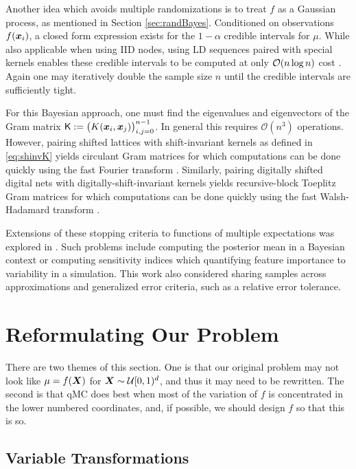 \documentclass{svproc}
\begin{document}
Another idea which avoids multiple randomizations is to treat $f$ as a Gaussian process, as mentioned in Section \ref{sec:randBayes}. Conditioned on observations $f({\boldsymbol{x}}_i)$, a closed form expression exists for the $1-\alpha$ credible intervals for $\mu$. While also applicable when using IID nodes, using LD sequences paired with special kernels enables these credible intervals to be computed at only ${\mathcal{O}}(n \log n)$ cost \cite{Jag19a,JagHic22a,RatHic19a}. Again one may iteratively double the sample size $n$ until the credible intervals are sufficiently tight.

For this Bayesian approach, one must find the eigenvalues and eigenvectors of the Gram matrix $\mathsf{K} : = \bigl(K({\boldsymbol{x}}_i,{\boldsymbol{x}}_j) \bigr)_{i,j=0}^{n-1}$.  In general this requires $\mathcal{O}(n^3)$ operations.  However, pairing shifted lattices with shift-invariant kernels as defined in \eqref{eq:shinvK} yields circulant Gram matrices for which computations can be done quickly using the fast Fourier transform \cite{RatHic19a}. Similarly, pairing digitally shifted digital nets with digitally-shift-invariant kernels yields recursive-block Toeplitz Gram matrices for which computations can be done quickly using the fast Walsh-Hadamard transform \cite{JagHic22a}. 

Extensions of these stopping criteria to functions of multiple expectations was explored in \cite{sorokin2022bounding}. Such problems include computing the posterior mean in a Bayesian context or computing  sensitivity indices which  quantifying feature importance to variability in a simulation. This work also considered sharing samples across approximations and generalized error criteria, such as a relative error tolerance.  

\section{Reformulating Our Problem} \label{sec:reformulate}

There are two themes of this section.  One is that our original problem may not look like $\mu = f({\boldsymbol{X}})$ for ${\boldsymbol{X}} \sim \mathcal{U}[0,1)^d$, and thus it may need to be rewritten.  The second is that qMC does best when most of the variation of $f$ is concentrated in the lower numbered coordinates, and, if possible, we should design $f$ so that this is so.


\subsection{Variable Transformations} 
\end{document}
